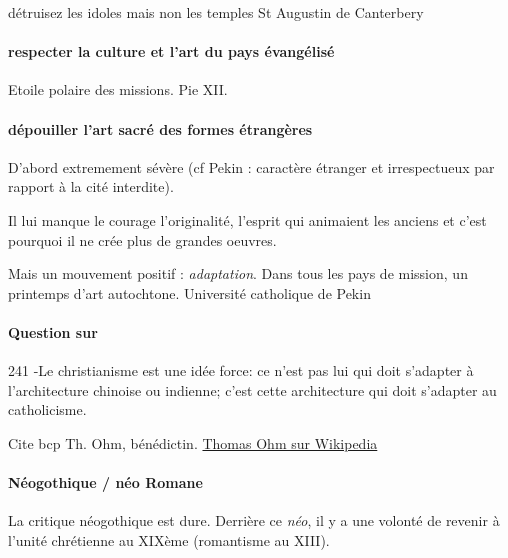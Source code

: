 \begin{singlequote}
détruisez les idoles mais non les temples
St Augustin de Canterbery
\end{singlequote}

\paragraph{respecter la culture et l'art du pays évangélisé }

\begin{singlequote}
    Etoile polaire des missions. Pie XII.
\end{singlequote}


\paragraph{dépouiller l'art sacré des formes étrangères}
D'abord extremement sévère (cf Pekin : caractère étranger et irrespectueux par rapport à la cité interdite). 

\begin{singlequote}
    Il lui manque le courage l'originalité, l'esprit qui animaient les anciens et c'est pourquoi il ne crée plus de grandes oeuvres.
\end{singlequote}

Mais un mouvement positif : \textit{adaptation}. Dans tous les pays de mission, un printemps d'art autochtone.
Université catholique de Pekin






\paragraph{Question sur }

\begin{singlequote}
    241 -Le christianisme est une idée force: ce n'est pas lui qui doit s'adapter
à l'architecture chinoise ou indienne; c'est cette architecture qui
doit s'adapter au catholicisme. 
\end{singlequote}
 Cite bcp Th. Ohm, bénédictin. \href{https://de.wikipedia.org/wiki/Thomas_Ohm}{Thomas Ohm sur Wikipedia}
 
\paragraph{Néogothique / néo Romane} La critique néogothique est dure. Derrière ce \textit{néo}, il y a une volonté de revenir à l'unité chrétienne au XIXème (romantisme au XIII).

